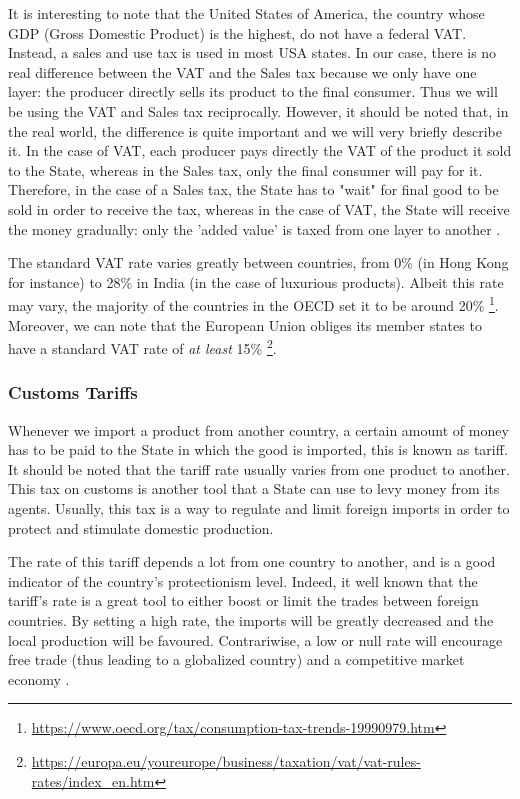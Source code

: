     It is interesting to note that the United States of America, the country whose GDP (Gross Domestic Product) is the highest, do not have a federal VAT. Instead, a sales and use tax is used in most USA states. In our case, there is no real difference between the VAT and the Sales tax because we only have one layer: the producer directly sells its product to the final consumer. Thus we will be using the VAT and Sales tax reciprocally. 
    However, it should be noted that, in the real world, the difference is quite important and we will very briefly describe it. In the case of VAT, each producer pays directly the VAT of the product it sold to the State, whereas in the Sales tax, only the final consumer will pay for it. Therefore, in the case of a Sales tax, the State has to "wait" for final good to be sold in order to receive the tax, whereas in the case of VAT, the State will receive the money gradually: only the 'added value' is taxed from one layer to another \cite{OriginOfVAT}.
    
    The standard VAT rate varies greatly between countries, from 0\% (in Hong Kong for instance) to 28\% in India (in the case of luxurious products). Albeit this rate may vary, the majority of the countries in the OECD set it to be around 20\% \footnote{\url{https://www.oecd.org/tax/consumption-tax-trends-19990979.htm}}. Moreover, we can note that the European Union obliges its member states to have a standard VAT rate of \emph{at least} 15\% \footnote{\url{https://europa.eu/youreurope/business/taxation/vat/vat-rules-rates/index_en.htm}}.
    
    
    \subsubsection{Customs Tariffs}
    
    Whenever we import a product from another country, a certain amount of money has to be paid to the State in which the good is imported, this is known as tariff. It should be noted that the tariff rate usually varies from one product to another. This tax on customs is another tool that a State can use to levy money from its agents. Usually, this tax is a way to regulate and limit foreign imports in order to protect and stimulate domestic production.
    
    The rate of this tariff depends a lot from one country to another, and is a good indicator of the country's protectionism level. Indeed, it well known that the tariff's rate is a great tool to either boost or limit the trades between foreign countries. By setting a high rate, the imports will be greatly decreased and the local production will be favoured. Contrariwise, a low or null rate will encourage  free trade (thus leading to a globalized country) and a competitive market economy \cite{virmani2002towards}.
    
